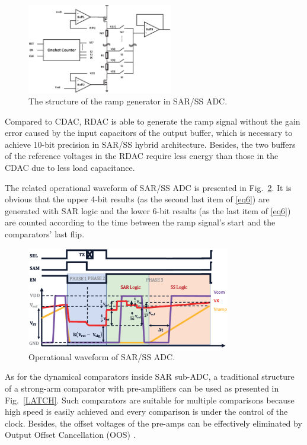 \begin{figure}[htbp] 
	\centerline{\includegraphics[width=2.5in]{./Figures/RRAMP.eps}}
	\caption{The structure of the ramp generator in SAR/SS ADC.}
	\label{RRAMP}
\end{figure}

Compared to CDAC, RDAC is able to generate the ramp signal without the gain error caused by the input capacitors of the output buffer, 
which is necessary to achieve 10-bit precision in SAR/SS hybrid architecture.
Besides, the two buffers of the reference voltages in the RDAC require less energy than those in the CDAC due to less load capacitance.  

The related operational waveform of SAR/SS ADC is presented in Fig.~\ref{SARWAVE}. It is obvious that the upper 4-bit results (as the second last item of \eqref{eq6}) are generated 
with SAR logic and the lower 6-bit results (as the last item of \eqref{eq6}) are counted according to the time between the ramp signal’s start and the comparators’ last flip. 

\begin{figure}[htbp]
	\centerline{\includegraphics[width=3.5in]{./Figures/SARWAVE.eps}}
	\caption{Operational waveform of SAR/SS ADC.}
	\label{SARWAVE}
\end{figure} 

As for the dynamical comparators inside SAR sub-ADC, a traditional structure of a strong-arm comparator with pre-amplifiers can be used as presented in Fig.~\ref{LATCH}. Such comparators 
are suitable for multiple comparisons because high speed is easily achieved and every comparison is under the control of the clock. Besides, the offset voltages of the pre-amps can be effectively eliminated by Output Offset Cancellation (OOS) \cite{razavi_design_1992}.

